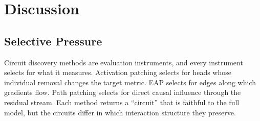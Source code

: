 \documentclass{article}
\begin{document}
%
%
%
%
%



%

\section{Discussion}
\label{sec:discussion}

\subsection{Selective Pressure}

Circuit discovery methods are evaluation instruments, and every
instrument selects for what it measures. Activation patching selects for
heads whose individual removal changes the target metric. EAP selects
for edges along which gradients flow. Path patching selects for direct
causal influence through the residual stream. Each method returns a
``circuit'' that is faithful to the full model, but the circuits differ
in which interaction structure they preserve.
\end{document}
